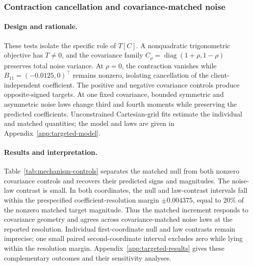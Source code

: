 \subsubsection{Contraction cancellation and covariance-matched noise}
\label{sec:num-mechanism-controls}

\paragraph{Design and rationale.}
These tests isolate the specific role of $T[C]$. A nonquadratic
trigonometric objective has $T\ne0$, and the covariance family
$C_\rho=\operatorname{diag}(1+\rho,1-\rho)$ preserves total noise
variance. At $\rho=0$, the contraction vanishes while
$B_{11}=(-0.0125,0)^\top$ remains nonzero, isolating cancellation of the
client-independent coefficient. The positive and negative covariance
controls produce opposite-signed targets. At one fixed covariance,
bounded symmetric and asymmetric noise laws change third and fourth
moments while preserving the predicted coefficients. Unconstrained
Cartesian-grid fits estimate the individual and matched quantities;
the model and laws are given in Appendix~\ref{app:targeted-model}.

\paragraph{Results and interpretation.}
Table~\ref{tab:mechanism-controls} separates the matched null from both
nonzero covariance controls and recovers their predicted signs and
magnitudes. The noise-law contrast is small. In both coordinates, the
null and law-contrast intervals fall within the prespecified
coefficient-resolution margin $\pm0.004375$, equal to $20\%$ of the
nonzero matched target magnitude. Thus the matched increment responds
to covariance geometry and agrees across covariance-matched noise laws
at the reported resolution. Individual first-coordinate null and
law contrasts remain imprecise; one small paired second-coordinate
interval excludes zero while lying within the resolution margin.
Appendix~\ref{app:targeted-results} gives these complementary outcomes
and their sensitivity analyses.

